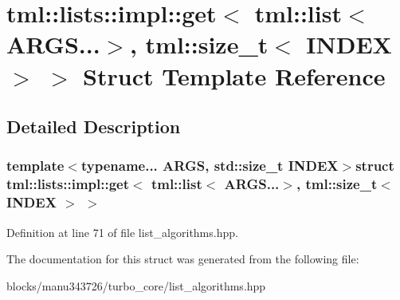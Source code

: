 \hypertarget{structtml_1_1lists_1_1impl_1_1get_3_01tml_1_1list_3_01_a_r_g_s_8_8_8_4_00_01tml_1_1size__t_3_01_i_n_d_e_x_01_4_01_4}{\section{tml\+:\+:lists\+:\+:impl\+:\+:get$<$ tml\+:\+:list$<$ A\+R\+G\+S...$>$, tml\+:\+:size\+\_\+t$<$ I\+N\+D\+E\+X $>$ $>$ Struct Template Reference}
\label{structtml_1_1lists_1_1impl_1_1get_3_01tml_1_1list_3_01_a_r_g_s_8_8_8_4_00_01tml_1_1size__t_3_01_i_n_d_e_x_01_4_01_4}
}


\subsection{Detailed Description}
\subsubsection*{template$<$typename... A\+R\+G\+S, std\+::size\+\_\+t I\+N\+D\+E\+X$>$struct tml\+::lists\+::impl\+::get$<$ tml\+::list$<$ A\+R\+G\+S...$>$, tml\+::size\+\_\+t$<$ I\+N\+D\+E\+X $>$ $>$}



Definition at line 71 of file list\+\_\+algorithms.\+hpp.



The documentation for this struct was generated from the following file\+:\begin{DoxyCompactItemize}
\item 
blocks/manu343726/turbo\+\_\+core/list\+\_\+algorithms.\+hpp\end{DoxyCompactItemize}
